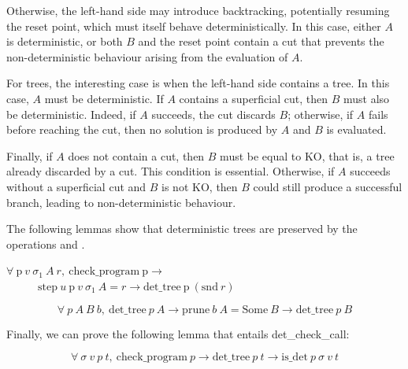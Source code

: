 Otherwise, the left-hand side may introduce backtracking, potentially
resuming the reset point, which must itself behave deterministically.
In this case, either $A$ is deterministic, or both $B$ and the reset
point contain a cut that prevents the non-deterministic behaviour arising
from the evaluation of $A$.

For \orC trees, the interesting case is when the left-hand side contains
a tree. In this case, $A$ must be deterministic. If $A$
contains a superficial cut, then $B$ must also be deterministic. Indeed,
if $A$ succeeds, the cut discards $B$; otherwise, if $A$ fails before
reaching the cut, then no solution is produced by $A$ and $B$ is evaluated.

Finally, if $A$ does not contain a cut, then $B$ must be equal to
$\mathrm{KO}$, that is, a tree already discarded by a cut. This
condition is essential. Otherwise, if $A$ succeeds without a
superficial cut and $B$ is not $\mathrm{KO}$, then $B$ could still
produce a successful branch, leading to non-deterministic behaviour.

The following lemmas show that deterministic trees are preserved by the
operations \step and \na.

%
\begin{lemma}\label{th:dettreestep}
  $\forall\ \mathrm{p}\ v\ \sigma_1\ A\ r ,\ \mathrm{check\_program}\ \mathrm{p} \to$\\
	$\phantom{xxxxx} \mathrm{step}\ u\ \mathrm{p}\ v\ \sigma_1\ A = r \to \mathrm{det\_tree}\ \mathrm{p}\ (\mathrm{snd}\ r) $
\end{lemma}

% 
\begin{lemma}\label{th:dettreeprune}%
	$$\forall\ p\ A\ B\ b ,\ \mathrm{det\_tree}\ p\ A \to \mathrm{prune}\ b\ A = \mathrm{Some}\ B \to \mathrm{det\_tree}\ p\ B $$
\end{lemma}

\noindent Finally, we can prove the following lemma that entails det\_check\_call:

% 
\begin{lemma}\label{th:detchecktree}%
	$$\forall\ \sigma\ v\ p\ t ,\ \mathrm{check\_program}\ p \to \mathrm{det\_tree}\ p\ t \to \mathrm{is\_det}\ p\ \sigma\ v\ t $$
\end{lemma}



